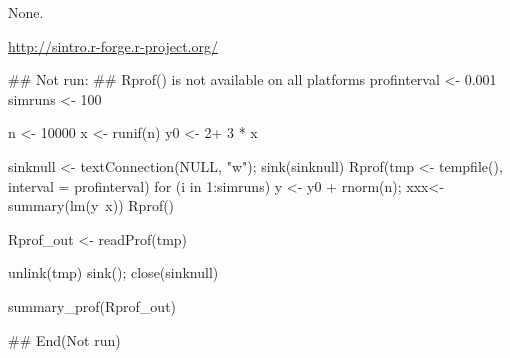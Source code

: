 \documentclass[a4paper]{book}
\begin{document}
%
\begin{Value}
None.
\end{Value}
%
\begin{References}\relax
  \url{http://sintro.r-forge.r-project.org/} 
\end{References}
%
\begin{SeeAlso}\relax
{}
\end{SeeAlso}
%
\begin{Examples}
\begin{ExampleCode}
	## Not run: 
## Rprof() is not available on all platforms
profinterval <- 0.001
simruns <- 100

n <- 10000
x <- runif(n)
y0 <- 2+ 3 * x

sinknull <- textConnection(NULL, "w"); sink(sinknull)
Rprof(tmp <- tempfile(), interval = profinterval)
for (i in 1:simruns) {y <- y0 +  rnorm(n); xxx<- summary(lm(y~x))}
Rprof()

Rprof_out <- readProf(tmp)

unlink(tmp)
sink(); close(sinknull)

summary_prof(Rprof_out)

## End(Not run)

\end{ExampleCode}
\end{Examples}
\printindex{}
\end{document}
